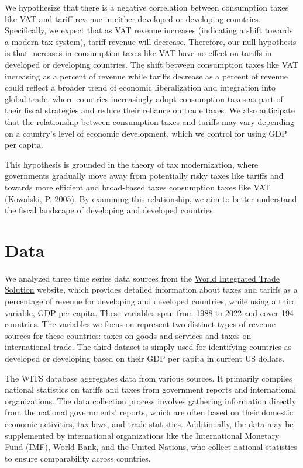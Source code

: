 \documentclass[12pt]{article}
\begin{document}
We hypothesize that there is a negative correlation between consumption taxes like VAT and tariff revenue in either developed or developing countries. Specifically, we expect that as VAT revenue increases (indicating a shift towards a modern tax system), tariff revenue will decrease. Therefore, our null hypothesis is that increases in consumption taxes like VAT have no effect on tariffs in developed or developing countries. 
The shift between consumption taxes like VAT increasing as a percent of revenue while tariffs decrease as a percent of revenue could reflect a broader trend of economic liberalization and integration into global trade, where countries increasingly adopt consumption taxes as part of their fiscal strategies and reduce their reliance on trade taxes. We also anticipate that the relationship between consumption taxes and tariffs may vary depending on a country's level of economic development, which we control for using GDP per capita.

This hypothesis is grounded in the theory of tax modernization, where governments gradually move away from potentially risky taxes like tariffs and towards more efficient and broad-based taxes consumption taxes like VAT (Kowalski, P. 2005). By examining this relationship, we aim to better understand the fiscal landscape of developing and developed countries.

\section{Data}
\label{sec:data}

We analyzed three time series data sources from the \href{https://wits.worldbank.org/CountryProfile/en/Country/BY-COUNTRY/StartYear/1988/EndYear/2022/Indicator/GC-TAX-GSRV-VA-ZS}{World Integrated Trade Solution} website, which provides detailed information about taxes and tariffs as a percentage of revenue for developing and developed countries, while using a third variable, GDP per capita. These variables span from 1988 to 2022 and cover 194 countries. The variables we focus on represent two distinct types of revenue sources for these countries: taxes on goods and services and taxes on international trade. The third dataset is simply used for identifying countries as developed or developing based on their GDP per capita in current US dollars. 

The WITS database aggregates data from various sources. It primarily compiles national statistics on tariffs and taxes from government reports and international organizations. The data collection process involves gathering information directly from the national governments' reports, which are often based on their domestic economic activities, tax laws, and trade statistics. Additionally, the data may be supplemented by international organizations like the International Monetary Fund (IMF), World Bank, and the United Nations, who collect national statistics to ensure comparability across countries.
\end{document}
